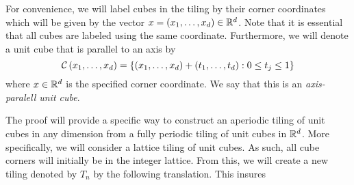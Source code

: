 \documentclass[../thesis.tex]{subfiles}
\begin{document}
For convenience, we will label cubes in the tiling by their corner coordinates which will be given by the vector $x = (x_1,\dots,x_d) \in \mathbb{R}^d$. Note that it is essential that all cubes are labeled using the same coordinate. Furthermore, we will denote a unit cube that is parallel to an axis by
\begin{equation*}
    \mathcal{C}\left(x_1,\dots,x_d\right) = \left\{(x_1,\dots,x_d) + (t_1,\dots,t_d) : 0 \leq t_j \leq 1\right\}
\end{equation*} 
where $x\in \mathbb{R}^d$ is the specified corner coordinate. We say that this is an \emph{axis-paralell unit cube}. 

The proof will provide a specific way to construct an aperiodic tiling of unit cubes in any dimension from a fully periodic tiling of unit cubes in $\mathbb{R}^d$. More specifically, we will consider a lattice tiling of unit cubes. As such, all cube corners will initially be in the integer lattice. From this, we will create a new tiling denoted by $T_n$ by the following translation. This insures
\end{document}
